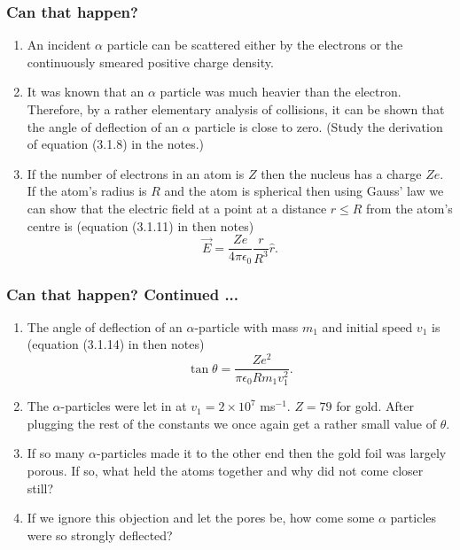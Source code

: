 \documentclass{beamer}
\begin{document}
\begin{frame}
\frametitle{Can that happen?}
\begin{enumerate}
\item An incident $\alpha$ particle can be scattered either by the electrons
or the continuously smeared positive charge density.
\item It was known that an $\alpha$ particle was much heavier than the electron.
Therefore, by a rather elementary analysis of collisions, it can be shown that
the angle of deflection of an $\alpha$ particle is close to zero. (Study the
derivation of equation (3.1.8) in the notes.)
\item If the number of electrons in an atom is $Z$ then the nucleus has a charge
$Ze$. If the atom's radius is $R$ and the atom is spherical then using Gauss' 
law we can show that the electric field at a point at a distance $r \le R$ from
the atom's centre is (equation (3.1.11) in then notes)
\begin{equation}\label{e1}
\vec{E} = \frac{Ze}{4\pi\epsilon_0}\frac{r}{R^3}\hat{r}.
\end{equation}
\end{enumerate}
\end{frame}

\begin{frame}
\frametitle{Can that happen? Continued ...}
\begin{enumerate}
\item The angle of deflection of an $\alpha$-particle with mass $m_1$ and 
initial speed $v_1$ is (equation (3.1.14) in then notes)
\begin{equation}\label{e2}
\tan\theta = \frac{Ze^2}{\pi\epsilon_0 Rm_1v_1^2}.
\end{equation}
\item The $\alpha$-particles were let in at $v_1 = 2 \times 10^7$ ms${}^{-1}$.
$Z = 79$ for gold. After plugging the rest of the constants we once again get
a rather small value of $\theta$.
\item If so many $\alpha$-particles made it to the other end then the gold 
foil was largely porous. If so, what held the atoms together and why did not
come closer still?
\item If we ignore this objection and let the pores be, how come some $\alpha$
particles were so strongly deflected?
\end{enumerate}
\end{frame}
\end{document}

